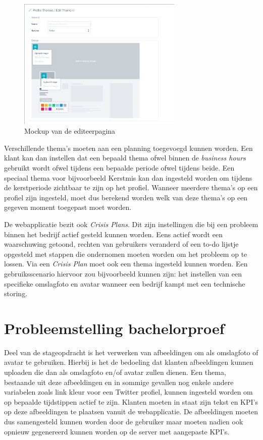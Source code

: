 \begin{figure}[H]
	\centering
	\includegraphics[width=0.7\textwidth]{Figuren/EditThemeMockup.png}
	\caption{Mockup van de editeerpagina \cite{EditThemeMockup}} %
	\label{fig:EditTheme}
\end{figure} 

Verschillende thema's moeten aan een planning toegevoegd kunnen worden. Een klant kan dan instellen dat een bepaald thema ofwel binnen de \textit{business hours} gebruikt wordt ofwel tijdens een bepaalde periode ofwel tijdens beide. Een speciaal thema voor bijvoorbeeld Kerstmis kan dan ingesteld worden om tijdens de kerstperiode zichtbaar te zijn op het profiel. Wanneer meerdere thema's op een profiel zijn ingesteld, moet dus berekend worden welk van deze thema's op een gegeven moment toegepast moet worden. 

\newpage
De webapplicatie bezit ook \textit{Crisis Plans}. Dit zijn instellingen die bij een probleem binnen het bedrijf actief gesteld kunnen worden. Eens actief wordt een waarschuwing getoond, rechten van gebruikers veranderd of een to-do lijstje opgesteld met stappen die ondernomen moeten worden om het probleem op te lossen. Via een \textit{Crisis Plan} moet ook een thema ingesteld kunnen worden. Een gebruiksscenario hiervoor zou bijvoorbeeld kunnen zijn: het instellen van een specifieke omslagfoto en avatar wanneer een bedrijf kampt met een technische storing. 

\section{Probleemstelling bachelorproef}

Deel van de stageopdracht is het verwerken van afbeeldingen om als omslagfoto of avatar te gebruiken. Hierbij is het de bedoeling dat klanten afbeeldingen kunnen uploaden die dan als omslagfoto en/of avatar zullen dienen. Een thema, bestaande uit deze afbeeldingen en in sommige gevallen nog enkele andere variabelen zoals link kleur voor een Twitter profiel, kunnen ingesteld worden om op bepaalde tijdstippen actief te zijn. Klanten moeten in staat zijn tekst en KPI's op deze afbeeldingen te plaatsen vanuit de webapplicatie. De afbeeldingen moeten dus samengesteld kunnen worden door de gebruiker maar moeten nadien ook opnieuw gegenereerd kunnen worden op de server met aangepaste KPI's. 

